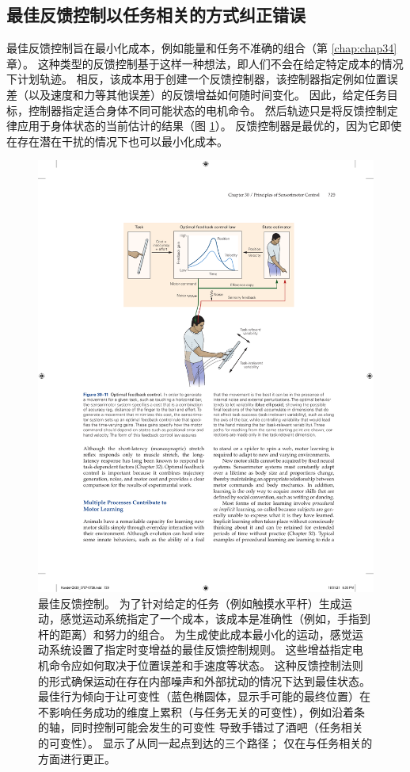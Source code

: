 \subsection{最佳反馈控制以任务相关的方式纠正错误}

最佳反馈控制旨在最小化成本，例如能量和任务不准确的组合（第 \ref{chap:chap34} 章）。 这种类型的反馈控制基于这样一种想法，即人们不会在给定特定成本的情况下计划轨迹。 相反，该成本用于创建一个反馈控制器，该控制器指定例如位置误差（以及速度和力等其他误差）的反馈增益如何随时间变化。 因此，给定任务目标，控制器指定适合身体不同可能状态的电机命令。 
然后轨迹只是将反馈控制定律应用于身体状态的当前估计的结果（图 \ref{fig:30_11}）。
反馈控制器是最优的，因为它即使在存在潜在干扰的情况下也可以最小化成本。

\begin{figure}[htbp]
	\centering
	\includegraphics[width=0.7\linewidth]{chap30/fig_30_11}
	\caption{最佳反馈控制。 为了针对给定的任务（例如触摸水平杆）生成运动，感觉运动系统指定了一个成本，该成本是准确性（例如，手指到杆的距离）和努力的组合。 为生成使此成本最小化的运动，感觉运动系统设置了指定时变增益的最佳反馈控制规则。 这些增益指定电机命令应如何取决于位置误差和手速度等状态。 这种反馈控制法则的形式确保运动在存在内部噪声和外部扰动的情况下达到最佳状态。 最佳行为倾向于让可变性（蓝色椭圆体，显示手可能的最终位置）在不影响任务成功的维度上累积（与任务无关的可变性），例如沿着条的轴，同时控制可能会发生的可变性 导致手错过了酒吧（任务相关的可变性）。 显示了从同一起点到达的三个路径； 仅在与任务相关的方面进行更正。}
	\label{fig:30_11}
\end{figure}

